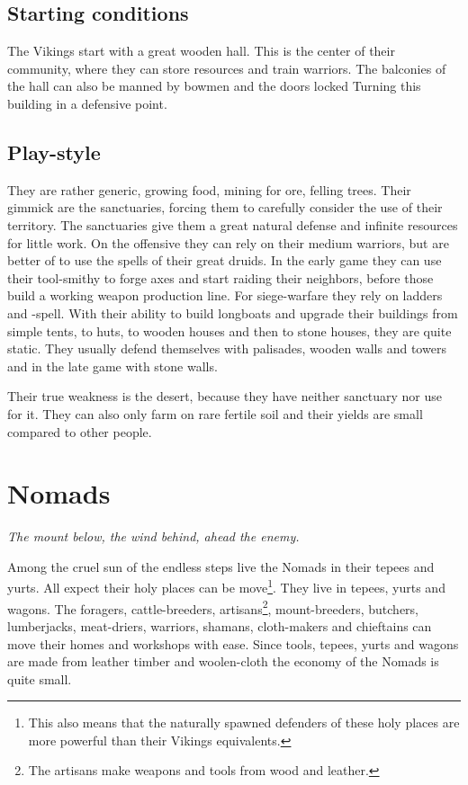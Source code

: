 \documentclass[a4paper]{book}
\begin{document}
\subsection{Starting conditions}
The \gls{Vikings} start with a great wooden hall. This is the center of their
community, where they can store resources and train warriors. The balconies of
the hall can also be manned by bowmen and the doors locked Turning this
building in a defensive point.

\subsection{Play-style}
They are rather generic, growing food, mining for ore, felling trees. Their
gimmick are the sanctuaries, forcing them to carefully consider the use of
their territory. The sanctuaries give them a great natural defense and infinite
resources for little work. On the offensive they can rely on their medium
warriors, but are better of to use the spells of their great druids. In the
early game they can use their tool-smithy to forge axes and start raiding their
neighbors, before those build a working weapon production line. For
siege-warfare they rely on ladders and -spell. With
their ability to build longboats and upgrade their buildings from simple tents,
to huts, to wooden houses and then to stone houses, they are quite static. They
usually defend themselves with palisades, wooden walls and towers and in the
late game with stone walls.

Their true weakness is the desert, because they have neither sanctuary nor use
for it. They can also only farm on rare fertile soil and their yields are small
compared to other people.

\section{\Gls{Nomads}}

\begin{flushright}
	\emph{The mount below, the wind behind, ahead the enemy.}
\end{flushright}

Among the cruel sun of the endless steps live the \gls{Nomads} in their tepees
and yurts. All expect their holy places can be move\footnote{ This also means
	that the naturally spawned defenders of these holy places are more powerful
	than their \gls{Vikings} equivalents. }. They live in tepees, yurts and wagons.
The foragers, cattle-breeders, artisans\footnote{ The artisans make weapons and
	tools from wood and leather. }, mount-breeders, butchers, lumberjacks,
meat-driers, warriors, shamans, cloth-makers and chieftains can move their
homes and workshops with ease. Since tools, tepees, yurts and wagons are made
from leather timber and woolen-cloth the economy of the \gls{Nomads} is quite
small.
\end{document}
